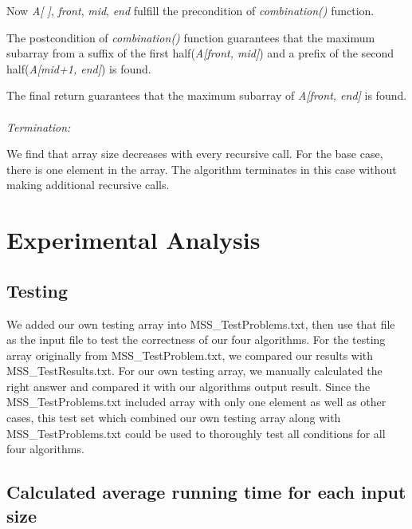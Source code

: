 \documentclass[11pt]{scrreprt}
\begin{document}
Now \textit{A[ ]}, \textit{front}, \textit{mid}, \textit{end} fulfill the precondition of \textit{combination()} function.

The postcondition of \textit{combination()} function guarantees that the maximum subarray from a suffix of the first half(\textit{A[front, mid]}) and a prefix of the second half(\textit{A[mid+1, end]}) is found.

The final return guarantees that the maximum subarray of \textit{A[front, end]} is found. \\\\
\emph{Termination:}

We find that array size decreases with every recursive call. For the base case, there is one element in the array. The algorithm terminates in this case without making additional recursive calls.


\chapter{Experimental Analysis}

\section{Testing}

We added our own testing array into MSS\_TestProblems.txt, then use that file as the input file to test the correctness of our four algorithms. For the testing array originally from MSS\_TestProblem.txt, we compared our results with MSS\_TestResults.txt. For our own testing array, we manually calculated the right answer and compared it with our algorithms output result. Since the MSS\_TestProblems.txt included array with only one element as well as other cases, this test set which combined our own testing array along with MSS\_TestProblems.txt could be used to thoroughly test all conditions for all four algorithms.

\section {Calculated average running time for each input size}
\end{document}
